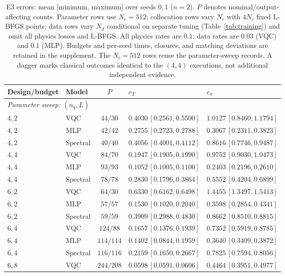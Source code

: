 \documentclass[11pt]{article}
\begin{document}
\begin{table}[!htbp]
\centering\footnotesize
\setlength{\tabcolsep}{4pt}
\caption{E3 errors: mean [minimum, maximum] over seeds $0,1$ ($n=2$).
$P$ denotes nominal/output-affecting counts. Parameter rows use $N_c=512$;
collocation rows vary $N_c$ with $4N_c$ fixed L-BFGS points; data rows vary
$N_d$ conditional on separate tuning (Table~\ref{tab:training}) and omit
all physics losses and L-BFGS. All physics rates are $0.1$;
data rates are $0.03$ (VQC) and $0.1$ (MLP). Budgets and per-seed times,
closures, and matching deviations are retained in the supplement.
The $N_c=512$ rows reuse the parameter-sweep records.
A dagger marks classical outcomes identical to the $(4,4)$ executions,
not additional independent evidence.}\label{tab:e3}
\begin{tabular}{llcll}
\toprule
Design/budget & Model & $P$ & $e_T$ & $e_\sigma$ \\
\midrule
\multicolumn{5}{l}{\textit{Parameter sweep: $(n_q,L)$}}\\
$4,2$ & VQC & $44/30$ & $0.4030\,[0.2561,0.5500]$ & $1.0127\,[0.8460,1.1794]$ \\
$4,2$ & MLP & $42/42$ & $0.2755\,[0.2723,0.2788]$ & $0.3067\,[0.2311,0.3823]$ \\
$4,2$ & Spectral & $40/40$ & $0.4056\,[0.4001,0.4112]$ & $0.8616\,[0.7746,0.9487]$ \\
$4,4$ & VQC & $84/70$ & $0.1947\,[0.1905,0.1990]$ & $0.9752\,[0.9030,1.0473]$ \\
$4,4$ & MLP & $93/93$ & $0.1052\,[0.1005,0.1100]$ & $0.2403\,[0.2196,0.2610]$ \\
$4,4$ & Spectral & $78/78$ & $0.2830\,[0.1796,0.3864]$ & $0.5552\,[0.4204,0.6899]$ \\
$6,2$ & VQC & $64/30$ & $0.6330\,[0.6162,0.6498]$ & $1.4455\,[1.3497,1.5413]$ \\
$6,2$ & MLP & $57/57$ & $0.1530\,[0.1020,0.2040]$ & $0.3598\,[0.2854,0.4341]$ \\
$6,2$ & Spectral & $59/59$ & $0.3909\,[0.2988,0.4830]$ & $0.8662\,[0.8510,0.8815]$ \\
$6,4$ & VQC & $124/88$ & $0.1657\,[0.1376,0.1939]$ & $0.7352\,[0.5919,0.8785]$ \\
$6,4$ & MLP & $114/114$ & $0.1402\,[0.0844,0.1959]$ & $0.3640\,[0.3409,0.3872]$ \\
$6,4$ & Spectral & $116/116$ & $0.2159\,[0.1650,0.2667]$ & $0.7825\,[0.7594,0.8056]$ \\
$6,8$ & VQC & $244/208$ & $0.0598\,[0.0591,0.0606]$ & $0.4464\,[0.3951,0.4977]$ \\

\end{tabular}
\end{table}
\end{document}
